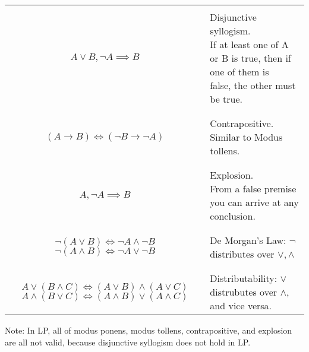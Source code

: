 \documentclass{article}
\newcommand{\false}{{\mathfrak{f}}}
\begin{document}
\begin{table}[H]
\begin{tabular}{c l}
        &\\
        $A \vee B, \lnot A \implies B$ & \makecell[l]{
            Disjunctive syllogism.\\
            If at least one of A or B is true, then if one of them is \\false, the other must be true.
        }\\
        &\\
        \hline
        &\\
        $(A \rightarrow B) \iff (\lnot B \rightarrow \lnot A)$ & Contrapositive. Similar to Modus tollens.\\
        &\\
        \hline
        &\\
        $A, \lnot A \implies B$ & \makecell[l]{
            Explosion. \\
            From a false premise you can arrive at any conclusion.
        }\\
        &\\
        \hline
        &\\
        \makecell{
            $\lnot (A \vee B) \iff \lnot A \wedge \lnot B$\\
            $\lnot (A \wedge B) \iff \lnot A \vee \lnot B$
        } & De Morgan's Law: $\lnot$ distributes over $\vee, \wedge$\\
        &\\
        \hline
        &\\
        \makecell{
            $A \vee (B \wedge C) \iff (A\vee B) \wedge (A \vee C)$\\
            $A \wedge (B \vee C) \iff (A \wedge B)\vee (A \wedge C)$
        } & Distributability: $\vee$ distrubutes over $\wedge$, and vice versa.

    \end{tabular}
\end{table} 

\large Note: In LP, all of modus ponens, modus tollens, contrapositive, and explosion are all not valid, because 
disjunctive syllogism does not hold in LP. 
\end{document}
